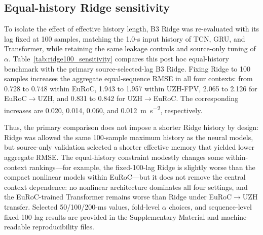 \documentclass[preprint,12pt]{elsarticle}
\begin{document}
\subsection{Equal-history Ridge sensitivity}
\label{sec:ridge100_sensitivity}

To isolate the effect of effective history length, B3 Ridge was re-evaluated with its lag fixed at 100 samples, matching the 1.0-s input history of TCN, GRU, and Transformer, while retaining the same leakage controls and source-only tuning of $\alpha$. Table~\ref{tab:ridge100_sensitivity} compares this post hoc equal-history benchmark with the primary source-selected-lag B3 Ridge. Fixing Ridge to 100 samples increases the aggregate equal-sequence RMSE in all four contexts: from 0.728 to 0.748 within EuRoC, 1.943 to 1.957 within UZH-FPV, 2.065 to 2.126 for EuRoC$\rightarrow$UZH, and 0.831 to 0.842 for UZH$\rightarrow$EuRoC. The corresponding increases are 0.020, 0.014, 0.060, and 0.012~\si{\metre\per\second\squared}, respectively.

\begin{table}[t]
\centering
\caption{Post hoc equal-history sensitivity for B3 Ridge. The sensitivity fixes the Ridge history at 100 samples (1.0~s), matching the neural-model history length, and retunes only $\alpha$ using the original source-only validation procedure. Brackets contain 95\% sequence-bootstrap intervals. $\Delta$ is fixed-100-lag RMSE minus the primary source-selected-lag Ridge RMSE; positive values indicate worse performance when Ridge is forced to use all 100 samples.}
\label{tab:ridge100_sensitivity}
\small
{}
\end{table}

Thus, the primary comparison does not impose a shorter Ridge history by design: Ridge was allowed the same 100-sample maximum history as the neural models, but source-only validation selected a shorter effective memory that yielded lower aggregate RMSE. The equal-history constraint modestly changes some within-context rankings---for example, the fixed-100-lag Ridge is slightly worse than the compact nonlinear models within EuRoC---but it does not remove the central context dependence: no nonlinear architecture dominates all four settings, and the EuRoC-trained Transformer remains worse than Ridge under EuRoC$\rightarrow$UZH transfer. Selected 50/100/200-ms values, fold-level $\alpha$ choices, and sequence-level fixed-100-lag results are provided in the Supplementary Material and machine-readable reproducibility files.
\end{document}
